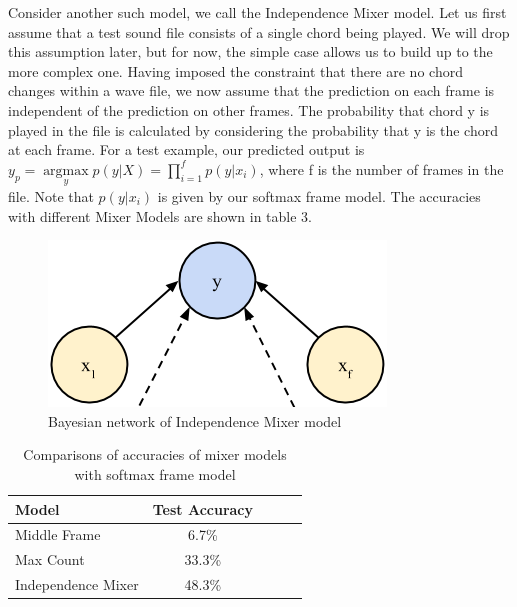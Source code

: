 \documentclass{article}
\begin{document}
Consider another such model, we call the Independence Mixer model. Let us first assume that a test sound file consists of a single chord being played. We will drop this assumption later, but for now, the simple case allows us to build up to the more complex one. Having imposed the constraint that there are no chord changes within a wave file, we now assume that the prediction on each frame is independent of the prediction on other frames. The probability that chord y is played in the file is calculated by considering the probability that y is the chord at each frame.  For a test example, our predicted output is $y_p = \underset{y}{\operatorname{argmax}} p(y | X) = \prod_{i=1}^fp(y | x_i)$, where f is the number of frames in the file. Note that $p(y | x_i)$ is given by our softmax frame model. The accuracies with different Mixer Models are shown in table 3.
\begin{figure}[ht]
\vskip 0.2in
\begin{center}
\centerline{\includegraphics[width=\columnwidth]{naive}}
\caption{Bayesian network of Independence Mixer model}
\label{icml-historical}
\end{center}
\vskip -0.2in
\end{figure}

\begin{table}[t]
\caption{Comparisons of accuracies of mixer models with softmax frame model}
\label{mfccvschroma}
\vskip 0.15in
\begin{center}
\begin{small}
\begin{sc}
\begin{tabular}{lcccr}
\hline
\abovespace\belowspace
Model & Test Accuracy \\
\hline
\abovespace
Middle Frame    & 6.7\%\\
Max Count & 33.3\%\\
Independence Mixer & 48.3\%\\
\hline
\end{tabular}
\end{sc}
\end{small}
\end{center}
\vskip -0.1in
\end{table}
\end{document}
